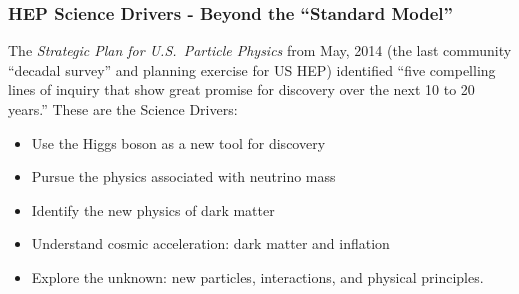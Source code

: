\begin{frame}
\frametitle{HEP Science Drivers - Beyond the ``Standard Model''}

The {\em Strategic Plan for U.S.\ Particle Physics} from May, 2014 (the
last community ``decadal survey'' and planning exercise for US HEP)
identified ``five compelling lines of inquiry that show 
great promise for discovery over the next 10 to 20 years.''
These are the Science Drivers:
\begin{itemize}
 \item Use the Higgs boson as a new tool for discovery
 \item Pursue the physics associated with neutrino mass
 \item Identify the new physics of dark matter
 \item Understand cosmic acceleration: dark matter and inflation
 \item Explore the unknown: new particles, interactions, and physical principles.
\end{itemize}

\end{frame}



